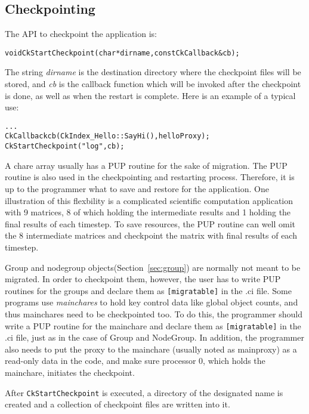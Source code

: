 \subsection{Checkpointing}

\label{sec:diskcheckpoint}
	The API to checkpoint the application is:

\begin{alltt} 
  void CkStartCheckpoint(char* dirname,const CkCallback& cb);
\end{alltt}

The string {\it dirname} is the destination directory where the checkpoint
files will be stored, and {\it cb} is the callback function which will be
invoked after the checkpoint is done, as well as when the restart is
complete. Here is an example of a typical use:

\begin{alltt} 
  . . .
  CkCallback cb(CkIndex_Hello::SayHi(),helloProxy);
  CkStartCheckpoint("log",cb);
\end{alltt}

A chare array usually has a PUP routine for the sake of migration. 
The PUP routine is also used in the checkpointing and restarting process.
Therefore, it is up to the programmer what to save and restore for
the application. One illustration of this flexbility is a complicated
scientific computation application with 9 matrices, 8 of which holding 
the intermediate results and 1 holding the final results of each timestep.
To save resources, the PUP routine can well omit the 8 intermediate matrices
and checkpoint the matrix with final results of each timestep. 

Group and nodegroup objects(Section~\ref{sec:group}) are normally not 
meant to be migrated. In order to checkpoint them, however, the user 
has to write PUP routines for the groups and declare them as 
{\tt [migratable]} in the .ci file. Some programs use {\it mainchares}
to hold key control data like global object counts, and thus mainchares need to be checkpointed too. To do this, the programmer should write
a PUP routine for the mainchare and declare them as {\tt [migratable]} 
in the .ci file, just as in the case of Group and NodeGroup. In addition,
the programmer also needs to put the proxy to the mainchare (usually 
noted as mainproxy) as a read-only data in the code, and make sure 
processor 0, which holds the mainchare, initiates the checkpoint.

After {\tt CkStartCheckpoint} is executed, a directory of the designated
name is created and a collection of checkpoint files are written into it. 


